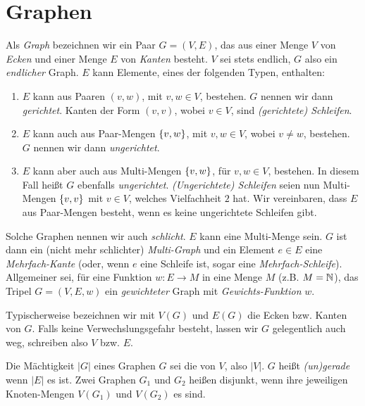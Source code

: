     \section{Graphen}

        \begin{definition} \label{def:graph}

            Als \textit{Graph} bezeichnen wir ein Paar $G = (V, E)$, das aus einer Menge $V$ von \textit{Ecken} und einer Menge $E$ von \textit{Kanten} besteht.
            $V$ sei stets endlich, $G$ also ein \textit{endlicher} Graph.
            $E$ kann Elemente, eines der folgenden Typen, enthalten:

            \begin{enumerate}[label = \arabic*.]

                \item $E$ kann aus Paaren $(v, w)$, mit $v, w \in V$, bestehen.
                $G$ nennen wir dann \textit{gerichtet}.
                Kanten der Form $(v, v)$, wobei $v \in V$, sind \textit{(gerichtete) Schleifen}.

                \item $E$ kann auch aus Paar-Mengen ${\left \{ v, w \right \}}$, mit $v, w \in V$, wobei $v \neq w$, bestehen.
                $G$ nennen wir dann \textit{ungerichtet}.

                \item $E$ kann aber auch aus Multi-Mengen ${\left \{ v, w \right \}}$, für $v, w \in V$, bestehen.
                In diesem Fall heißt $G$ ebenfalls \textit{ungerichtet}.
                \textit{(Ungerichtete) Schleifen} seien nun Multi-Mengen ${\left \{ v, v \right \}}$ mit $v \in V$, welches Vielfachheit $2$ hat.
                Wir vereinbaren, dass $E$ aus Paar-Mengen besteht, wenn es keine ungerichtete Schleifen gibt.

            \end{enumerate}

            Solche Graphen nennen wir auch \textit{schlicht}.
            $E$ kann eine Multi-Menge sein.
            $G$ ist dann ein (nicht mehr schlichter) \textit{Multi-Graph} und ein Element $e \in E$ eine \textit{Mehrfach-Kante} (oder, wenn $e$ eine Schleife ist, sogar eine \textit{Mehrfach-Schleife}).
            Allgemeiner sei, für eine Funktion $w: E \to M$ in eine Menge $M$ (z.B. $M = \mathbb N$), das Tripel $G = (V, E, w)$ ein \textit{gewichteter} Graph mit \textit{Gewichts-Funktion} $w$.

            Typischerweise bezeichnen wir mit $V(G)$ und $E(G)$ die Ecken bzw. Kanten von $G$.
            Falls keine Verwechslungsgefahr besteht, lassen wir $G$ gelegentlich auch weg, schreiben also $V$ bzw. $E$.

            Die Mächtigkeit $|G|$ eines Graphen $G$ sei die von $V$, also $|V|$.
            $G$ heißt \textit{(un)gerade} wenn $|E|$ es ist.
            Zwei Graphen $G_1$ und $G_2$ heißen disjunkt, wenn ihre jeweiligen Knoten-Mengen $V(G_1)$ und $V(G_2)$ es sind.

        \end{definition}


